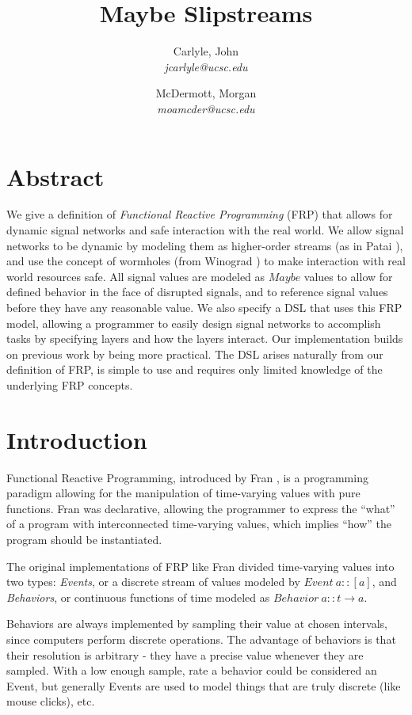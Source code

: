 \documentclass[twocolumn,11pt,english]{article}
\title{Maybe Slipstreams}
\date{}
\author{
  Carlyle, John\\
  \textit{jcarlyle@ucsc.edu}
  \and
  McDermott, Morgan\\
  \textit{moamcder@ucsc.edu}
}
\begin{document}
\maketitle

\section*{Abstract}
We give a definition of \textit{Functional Reactive Programming} (FRP) that allows for dynamic signal networks and safe interaction with the real world. We allow signal networks to be dynamic by modeling them as higher-order streams (as in Patai \cite{HighOrderStreams}), and use the concept of wormholes (from Winograd \cite{WinogradCort2012HS}) to make interaction with real world resources safe. All signal values are modeled as $Maybe$ values to allow for defined behavior in the face of disrupted signals, and to reference signal values before they have any reasonable value. We also specify a DSL that uses this FRP model, allowing a programmer to easily design signal networks to accomplish tasks by specifying layers and how the layers interact. Our implementation builds on previous work by being more practical. The DSL arises naturally from our definition of FRP, is simple to use and requires only limited knowledge of the underlying FRP concepts.

\section{Introduction}
  
Functional Reactive Programming, introduced by Fran \cite{ElliottHudak97:Fran}, is a programming paradigm allowing for the manipulation of time-varying values with pure functions. Fran was declarative, allowing the programmer to express the ``what'' of a program with interconnected time-varying values, which implies ``how'' the program should be instantiated. 

The original implementations of FRP like Fran divided time-varying values into two types: \textit{Events}, or a discrete stream of values modeled by $Event~a:: [a]$, and \textit{Behaviors}, or continuous functions of time modeled as $Behavior~a :: t \rightarrow a$. 

Behaviors are always implemented by sampling their value at chosen intervals, since computers perform discrete operations. The advantage of behaviors is that their resolution is arbitrary - they have a precise value whenever they are sampled. With a low enough sample, rate a behavior could be considered an Event, but generally Events are used to model things that are truly discrete (like mouse clicks), etc. 
\end{document}
